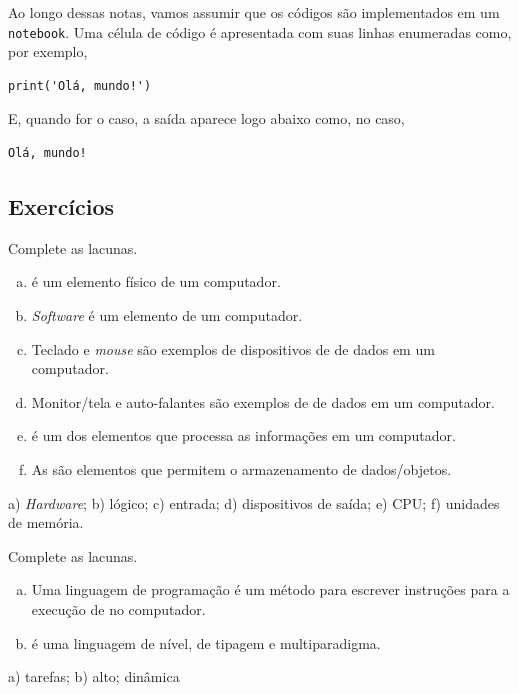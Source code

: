 \begin{itemize}
  Ao longo dessas notas, vamos assumir que os códigos são implementados em um \texttt{notebook}. Uma célula de código é apresentada com suas linhas enumeradas como, por exemplo,

\begin{lstlisting}[xrightmargin=2.5em]
print('Olá, mundo!')  
\end{lstlisting}

E, quando for o caso, a saída aparece logo abaixo como, no caso,

\begin{verbatim}
Olá, mundo!
\end{verbatim}

\end{itemize}

\subsection{Exercícios}


\begin{exer}
  Complete as lacunas.
  \begin{enumerate}[a)]
    \item \underline{} é um elemento físico de um computador.
    \item \textit{Software} é um elemento \underline{\phantom{lógico}} de um computador.
    \item Teclado e \textit{mouse} são exemplos de dispositivos de \underline{\phantom{entrada}} de dados em um computador.
    \item Monitor/tela e auto-falantes são exemplos de \underline{\phantom{dispositivos de saída}} de dados em um computador.
    \item \underline{\phantom{CPU}} é um dos elementos que processa as informações em um computador.
    \item As \underline{\phantom{unidades de memória}} são elementos que permitem o armazenamento de dados/objetos.
  \end{enumerate}
\end{exer}
\begin{resp}
  a) \textit{Hardware}; b) lógico; c) entrada; d) dispositivos de saída; e) CPU; f) unidades de memória.
\end{resp}

\begin{exer}
  Complete as lacunas.
  \begin{enumerate}[a)]
    \item Uma linguagem de programação é um método para escrever instruções para a execução de \underline{\phantom{tarefas}} no computador.
    \item {\python} é uma linguagem de \underline{\phantom{alto}} nível, de tipagem \underline{\phantom{dinâmica}} e multiparadigma.
  \end{enumerate}
\end{exer}
\begin{resp}
  a) tarefas; b) alto; dinâmica
\end{resp}


